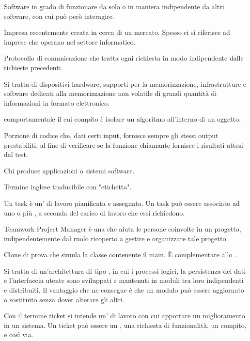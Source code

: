 Software in grado di funzionare da solo o in maniera indipendente da altri software, con cui può però interagire.

Impresa recentemente creata in cerca di un mercato. Spesso ci si riferisce ad imprese che operano nel settore informatico.

Protocollo di comunicazione che tratta ogni richiesta in modo indipendente dalle richieste precedenti.

Si tratta di dispositivi hardware, supporti per la memorizzazione, infrastrutture e software dedicati alla memorizzazione non volatile di grandi quantità di informazioni in formato elettronico.

 comportamentale il cui compito è isolare un algoritmo all'interno di un oggetto.

Porzione di codice che, dati certi input, fornisce sempre gli stessi output prestabiliti, al fine di verificare se la funzione chiamante fornisce i risultati attesi dal test.

Chi produce applicazioni o sistemi software.


Termine inglese traducibile con "etichetta". 

Un task è un' di lavoro pianificata e assegnata. Un task può essere associato ad uno o più , a seconda del carico di lavoro che essi richiedono.

Teamwork Project Manager è una  che aiuta le persone coinvolte in un progetto, indipendentemente dal ruolo ricoperto a gestire e organizzare tale progetto.

Clone di prova che simula la classe contenente il main. È complementare allo .

Si tratta di un'architettura di tipo , in cui i processi logici, la persistenza dei dati e l'interfaccia utente sono sviluppati e mantenuti in moduli tra loro indipendenti e distribuiti. Il vantaggio che ne consegue è che un modulo può essere aggiornato o sostituito senza dover alterare gli altri.

Con il termine ticket si intende un' di lavoro con cui apportare un miglioramento in un sistema. Un ticket può essere un , una richiesta di funzionalità, un compito, e così via.

